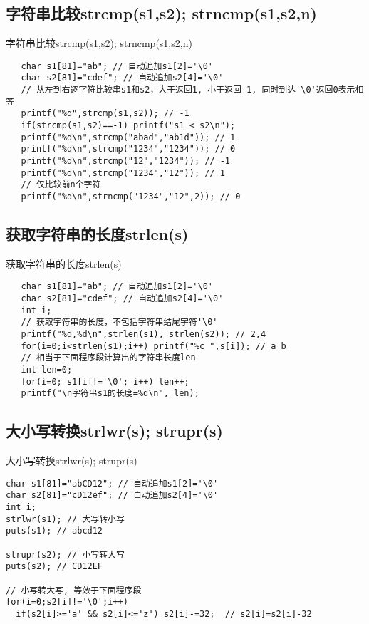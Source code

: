 \subsection{字符串比较strcmp(s1,s2); strncmp(s1,s2,n)}

\begin{frame}{字符串比较strcmp(s1,s2); strncmp(s1,s2,n)}
\begin{lstlisting}
   char s1[81]="ab"; // 自动追加s1[2]='\0'
   char s2[81]="cdef"; // 自动追加s2[4]='\0'
   // 从左到右逐字符比较串s1和s2，大于返回1, 小于返回-1, 同时到达'\0'返回0表示相等
   printf("%d",strcmp(s1,s2)); // -1
   if(strcmp(s1,s2)==-1) printf("s1 < s2\n");
   printf("%d\n",strcmp("abad","ab1d")); // 1
   printf("%d\n",strcmp("1234","1234")); // 0
   printf("%d\n",strcmp("12","1234")); // -1
   printf("%d\n",strcmp("1234","12")); // 1  
   // 仅比较前n个字符
   printf("%d\n",strncmp("1234","12",2)); // 0
\end{lstlisting}
\end{frame}

\subsection{获取字符串的长度strlen(s)}

\begin{frame}{获取字符串的长度strlen(s)}
\begin{lstlisting}
   char s1[81]="ab"; // 自动追加s1[2]='\0'
   char s2[81]="cdef"; // 自动追加s2[4]='\0'
   int i;
   // 获取字符串的长度，不包括字符串结尾字符'\0'
   printf("%d,%d\n",strlen(s1), strlen(s2)); // 2,4
   for(i=0;i<strlen(s1);i++) printf("%c ",s[i]); // a b
   // 相当于下面程序段计算出的字符串长度len
   int len=0;
   for(i=0; s1[i]!='\0'; i++) len++;
   printf("\n字符串s1的长度=%d\n", len);
\end{lstlisting}
\end{frame}

\subsection{大小写转换strlwr(s); strupr(s)}

\begin{frame}{大小写转换strlwr(s); strupr(s)}
\begin{lstlisting}
char s1[81]="abCD12"; // 自动追加s1[2]='\0'
char s2[81]="cD12ef"; // 自动追加s2[4]='\0'
int i;
strlwr(s1); // 大写转小写
puts(s1); // abcd12
 
strupr(s2); // 小写转大写
puts(s2); // CD12EF

// 小写转大写, 等效于下面程序段
for(i=0;s2[i]!='\0';i++)
  if(s2[i]>='a' && s2[i]<='z') s2[i]-=32;  // s2[i]=s2[i]-32
\end{lstlisting}
\end{frame}

